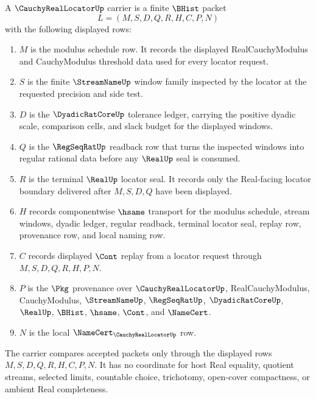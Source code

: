 \begin{definition}
\label{def:cauchy-real-locator-carrier}
A $\CauchyRealLocatorUp$ carrier is a finite $\BHist$ packet
$$
L=(M,S,D,Q,R,H,C,P,N)
$$
with the following displayed rows:
\begin{enumerate}
\item $M$ is the modulus schedule row. It records the displayed RealCauchyModulus and CauchyModulus threshold data used for every locator request.
\item $S$ is the finite $\StreamNameUp$ window family inspected by the locator at the requested precision and side test.
\item $D$ is the $\DyadicRatCoreUp$ tolerance ledger, carrying the positive dyadic scale, comparison cells, and slack budget for the displayed windows.
\item $Q$ is the $\RegSeqRatUp$ readback row that turns the inspected windows into regular rational data before any $\RealUp$ seal is consumed.
\item $R$ is the terminal $\RealUp$ locator seal. It records only the Real-facing locator boundary delivered after $M,S,D,Q$ have been displayed.
\item $H$ records componentwise $\hsame$ transport for the modulus schedule, stream windows, dyadic ledger, regular readback, terminal locator seal, replay row, provenance row, and local naming row.
\item $C$ records displayed $\Cont$ replay from a locator request through $M,S,D,Q,R,H,P,N$.
\item $P$ is the $\Pkg$ provenance over $\CauchyRealLocatorUp$, RealCauchyModulus, CauchyModulus, $\StreamNameUp$, $\RegSeqRatUp$, $\DyadicRatCoreUp$, $\RealUp$, $\BHist$, $\hsame$, $\Cont$, and $\NameCert$.
\item $N$ is the local $\NameCert_{\CauchyRealLocatorUp}$ row.
\end{enumerate}
The carrier compares accepted packets only through the displayed rows $M,S,D,Q,R,H,C,P,N$. It has no coordinate for host Real equality, quotient streams, selected limits, countable choice, trichotomy, open-cover compactness, or ambient Real completeness.
\end{definition}

